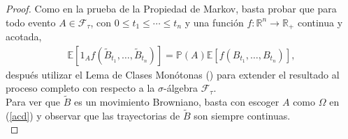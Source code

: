 \begin{proof}
Como en la prueba de la Propiedad de Markov, basta probar que para todo evento $A \in \mathcal{F}_{\tau}$, con $0 \leq t_1 \leq \cdots \leq t_n$ y una función $f : \mathbb{R}^n \rightarrow \mathbb{R}_{+}$ continua y acotada, 
	\begin{align}
	\mathbb{E} \left[ 1_A f \left( \tilde{B}_{t_1}, \ldots, \tilde{B}_{t_n} \right) \right] = \mathbb{P} (A) \mathbb{E} \left[ f \left( B_{t_1}, \ldots, B_{t_n} \right) \right], \label{acd}
	\end{align}
después utilizar el Lema de Clases Monótonas (\cite[p.~36]{jacodprotter}) para extender el resultado al proceso completo con respecto a la $\sigma$-álgebra $\mathcal{F}_{\tau}$. \\

Para ver que $\tilde{B}$ es un movimiento Browniano, basta con escoger $A$ como $\Omega$ en (\ref{acd}) y observar que las trayectorias de $\tilde{B}$ son siempre continuas. \\


\end{proof}
